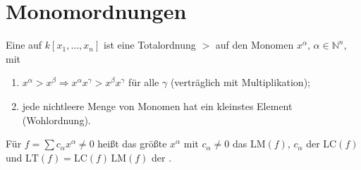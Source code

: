 \section{Monomordnungen}

\begin{definition}
Eine  auf $k[x_1, \ldots, x_n]$ ist eine Totalordnung $>$ auf den Monomen $x^{\alpha}$, $\alpha\in\mathbb N^{n}$, mit
\begin{enumerate}[label=(\roman*), leftmargin=1.8em]
\item $x^{\alpha} > x^{\beta}\Rightarrow x^{\alpha}x^{\gamma} > x^{\beta}x^{\gamma}$ für alle $\gamma$ (verträglich mit Multiplikation);
\item jede nichtleere Menge von Monomen hat ein kleinstes Element (Wohlordnung).
\end{enumerate}
Für $f = \sum c_{\alpha}x^{\alpha}\ne0$ heißt das größte $x^{\alpha}$ mit $c_{\alpha}\ne0$ das  $\mathrm{LM}(f)$, $c_{\alpha}$ der  $\mathrm{LC}(f)$ und $\mathrm{LT}(f) = \mathrm{LC}(f)\,\mathrm{LM}(f)$ der .
\end{definition}

